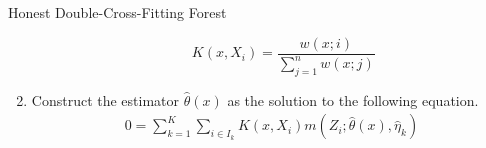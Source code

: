 \begin{boxD}
\begin{dfn}{Honest Double-Cross-Fitting Forest}
\begin{enumerate}
\begin{enumerate}
\begin{equation}
                    K(x, X_{i}) = \frac{w(x; i)}{\sum_{j = 1}^{n} w(x; j)}
                \end{equation}
            \end{enumerate}
			\item Construct the estimator $\hat{\theta}\left(x\right)$ as the solution to the following equation.
			      \begin{equation}
				      \begin{aligned}
					      0 = \sum_{k = 1}^{K} \sum_{i \in I_k} K(x, X_{i}) m\left(Z_{i}; \hat{\theta}\left(x\right), \hat{\eta}_{k}\right)
				      \end{aligned}
			      \end{equation}
		\end{enumerate}
	\end{dfn}
\end{boxD}
